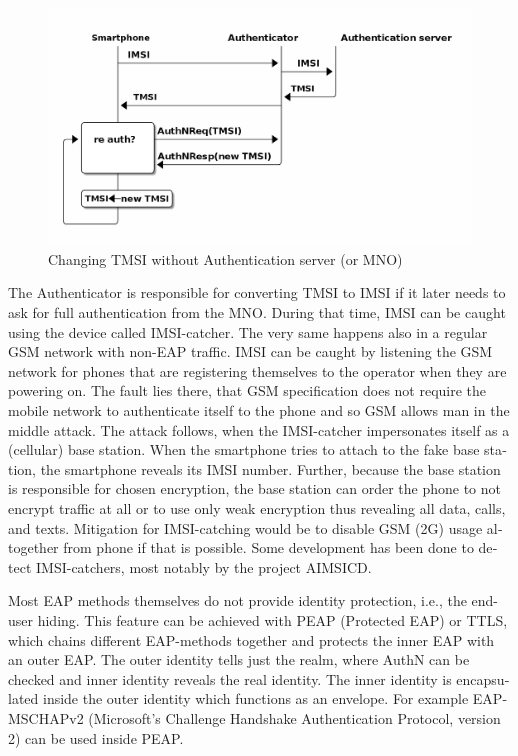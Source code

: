 \documentclass[12pt,a4paper,english]{tutthesis}
\begin{document}
\begin{otherlanguage}{english}
\begin{figure}[htb]
\centering
\includegraphics[width=.9\linewidth]{imsi-tmsi.png}
\caption{\label{fig:tmsi}Changing TMSI without Authentication server (or MNO)}
\end{figure}




The Authenticator is responsible for converting TMSI to IMSI if it
later needs to ask for full authentication from the MNO. During that
time, IMSI can be caught using the device called IMSI-catcher.  The
very same happens also in a regular GSM network with non-EAP traffic.
IMSI can be caught by listening the GSM network for phones that are
registering themselves to the operator when they are powering on.  The
fault lies there, that GSM specification does not require the mobile
network to authenticate itself to the phone and so GSM allows man in
the middle attack.  The attack follows, when the IMSI-catcher
impersonates itself as a (cellular) base station.  When the smartphone
tries to attach to the fake base station, the smartphone reveals its
IMSI number. Further, because the base station is responsible for
chosen encryption, the base station can order the phone to not encrypt
traffic at all or to use only weak encryption thus revealing all data,
calls, and texts. Mitigation for IMSI-catching would be to disable GSM
(2G) usage altogether from phone if that is
possible\cite{imsi-heise}. Some development has been done to detect
IMSI-catchers, most notably by the project AIMSICD\cite{aimcid}.


Most EAP methods themselves do not provide identity protection, i.e., the
end-user hiding.
This feature can be achieved with PEAP (Protected EAP) or TTLS, which
chains different EAP-methods together and protects the inner EAP with
an outer EAP. 
The outer identity tells just the realm, where AuthN can be checked
and inner identity reveals the real identity.  The inner identity is
encapsulated inside the outer identity which functions as an
envelope. 
For example EAP-MSCHAPv2 (Microsoft's Challenge
Handshake Authentication Protocol, version 2) can be used inside PEAP.



\end{otherlanguage}
\end{document}
